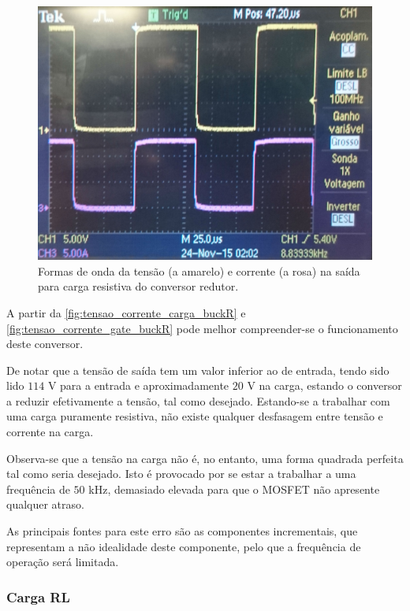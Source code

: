 \documentclass[a4paper,11pt]{article}
\numberwithin{equation}{section}
\begin{document}
\begin{figure}[h]
	\centering
	\includegraphics[keepaspectratio=true, scale=0.13]{img/figs/tensao_corrente_carga_buckR}
	\caption{Formas de onda da tensão (a amarelo) e corrente (a rosa) na saída para carga resistiva do conversor redutor.}
	\label{fig:tensao_corrente_carga_buckR}
	\vspace{-0.8em}
\end{figure} 

A partir da \autoref{fig:tensao_corrente_carga_buckR} e \autoref{fig:tensao_corrente_gate_buckR} pode melhor compreender-se o funcionamento deste conversor.

De notar que a tensão de saída tem um valor inferior ao de entrada, tendo sido lido $114$ V para a entrada e aproximadamente $20$ V na carga, estando o conversor a reduzir efetivamente a tensão, tal como desejado. Estando-se a trabalhar com uma carga puramente resistiva, não existe qualquer desfasagem entre tensão e corrente na carga.

Observa-se que a tensão na carga não é, no entanto, uma forma quadrada perfeita tal como seria desejado. Isto é provocado por se estar a trabalhar a uma frequência de $50$ kHz, demasiado elevada para que o MOSFET não apresente qualquer atraso. 

As principais fontes para este erro são as componentes incrementais, que representam a não idealidade deste componente, pelo que a frequência de operação será limitada.

\subsubsection{Carga RL}
\end{document}

